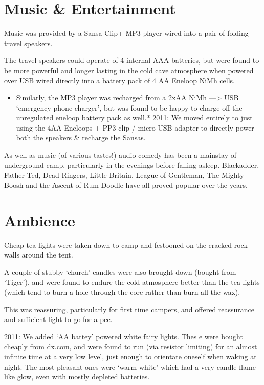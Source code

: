 \hypertarget{music-entertainment}{%
\section{Music \& Entertainment}\label{music-entertainment}}

Music was provided by a Sansa Clip+ MP3 player wired into a pair of
folding travel speakers.

The travel speakers could operate of 4 internal AAA batteries, but were
found to be more powerful and longer lasting in the cold cave atmosphere
when powered over USB wired directly into a battery pack of 4 AA Eneloop
NiMh cells.

\begin{itemize}
\tightlist
\item
  Similarly, the MP3 player was recharged from a 2xAA NiMh
  ---\textgreater{} USB `emergency phone charger', but was found to be
  happy to charge off the unregulated eneloop battery pack as well.*
  2011: We moved entirely to just using the 4AA Eneloops + PP3 clip /
  micro USB adapter to directly power both the speakers \& recharge the
  Sansas.
\end{itemize}

As well as music (of various tastes!) audio comedy has been a mainstay
of underground camp, particularly in the evenings before falling asleep.
Blackadder, Father Ted, Dead Ringers, Little Britain, League of
Gentleman, The Mighty Boosh and the Ascent of Rum Doodle have all proved
popular over the years.

\hypertarget{ambience}{%
\section{Ambience}\label{ambience}}

Cheap tea-lights were taken down to camp and festooned on the cracked
rock walls around the tent.

A couple of stubby `church' candles were also brought down (bought from
`Tiger'), and were found to endure the cold atmosphere better than the
tea lights (which tend to burn a hole through the core rather than burn
all the wax).

This was reassuring, particularly for first time campers, and offered
reassurance and sufficient light to go for a pee.

2011: We added `AA battey' powered white fairy lights. Thes e were
bought cheaply from dx.com, and were found to run (via resistor
limiting) for an almost infinite time at a very low level, just enough
to orientate oneself when waking at night. The most pleasant ones were
`warm white' which had a very candle-flame like glow, even with mostly
depleted batteries.


